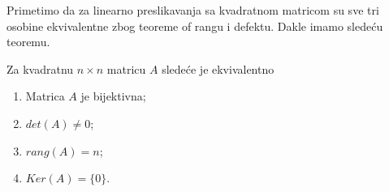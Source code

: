 \documentclass{article}
\begin{document}
Primetimo da za linearno preslikavanja sa kvadratnom matricom su sve tri osobine ekvivalentne zbog teoreme of rangu i defektu.
Dakle imamo sledeću teoremu.

\begin{theorem}
  Za kvadratnu $n \times n$ matricu $A$ sledeće je ekvivalentno
  \begin{enumerate}
    \item Matrica $A$ je bijektivna;
    \item $det(A) \neq 0$;
    \item $rang(A) = n$;
    \item $Ker(A) = \{0\}$.
  \end{enumerate}
\end{theorem}
\end{document}
